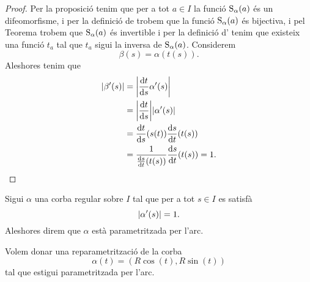 \documentclass[../Apunts.tex]{subfiles}
\begin{document}
	\begin{proof}
		Per la proposició  tenim que per a tot \(a\in I\) la funció \(\operatorname{S}_{\alpha}(a)\) és un difeomorfisme, i per la definició de  trobem que la funció \(\operatorname{S}_{\alpha}(a)\) és bijectiva, i pel Teorema  trobem que \(\operatorname{S}_{\alpha}(a)\) és invertible i per la definició d' tenim que existeix una funció \(t_{a}\) tal que \(t_{a}\) sigui la inversa de \(\operatorname{S}_{\alpha}(a)\). Considerem
		\[\beta(s)=\alpha(t(s)).\]
		Aleshores tenim que
		\begin{align*} %
			\norm{\beta'(s)}&=\norm{\frac{\diff t}{\diff s}\alpha'(s)} \\
			&=\abs{\frac{\diff t}{\diff s}}\norm{\alpha'(s)} \\
			&=\frac{\diff t}{\diff s}(s(t))\frac{\diff s}{\diff t}(t(s))\\
			&=\frac{1}{\frac{\diff s}{\diff t}(t(s))}\frac{\diff s}{\diff t}(t(s))=1. \qedhere
		\end{align*}
	\end{proof}
	\begin{definition}
		\label{def:corba parametritzada per l'arc}
		Sigui \(\alpha\) una corba regular sobre \(I\) tal que per a tot \(s\in I\) es satisfà
		\[\norm{\alpha'(s)}=1.\]
		Aleshores direm que \(\alpha\) està parametritzada per l'arc.
	\end{definition}
	\begin{example} %
		\label{ex:reparametrització per l'arc del cercle de radi R}
		\label{ex:circumferència de radi R parametritzat per l'arc}
		Volem donar una reparametrització de la corba
		\[\alpha(t)=(R\cos(t),R\sin(t))\]
		tal que estigui parametritzada per l'arc.
	\end{example}
\end{document}
